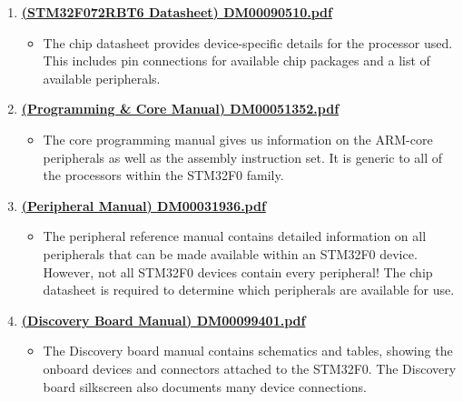 \documentclass[11pt,fleqn]{book} %
\begin{document}
\begin{enumerate}
    \item \href{http://www.st.com/content/ccc/resource/technical/document/datasheet/cd/46/43/83/22/d3/40/c8/DM00090510.pdf/files/DM00090510.pdf/jcr:content/translations/en.DM00090510.pdf}{\textbf{(STM32F072RBT6 Datasheet) DM00090510.pdf}}
    \begin{itemize}
        \item The chip datasheet provides device-specific details for the processor used. This includes pin connections for available chip packages and a list of available peripherals.
    \end{itemize}
    \item
    \href{http://www.st.com/content/ccc/resource/technical/document/programming_manual/fc/90/c7/17/a1/44/43/89/DM00051352.pdf/files/DM00051352.pdf/jcr:content/translations/en.DM00051352.pdf}{\textbf{(Programming \& Core Manual) DM00051352.pdf}}
    \begin{itemize}
        \item The core programming manual gives us information on the ARM-core peripherals as well as the assembly instruction set. It is generic to all of the processors within the STM32F0 family.
    \end{itemize}
    \item
    \href{http://www.st.com/content/ccc/resource/technical/document/reference_manual/c2/f8/8a/f2/18/e6/43/96/DM00031936.pdf/files/DM00031936.pdf/jcr:content/translations/en.DM00031936.pdf}{\textbf{(Peripheral Manual) DM00031936.pdf}}
    \begin{itemize}
        \item The peripheral reference manual contains detailed information on all peripherals that can be made available within an STM32F0 device. However, not all STM32F0 devices contain every peripheral! The chip datasheet is required to determine which peripherals are available for use.
    \end{itemize}
    \item 
    \href{http://www.st.com/content/ccc/resource/technical/document/user_manual/3b/8d/46/57/b7/a9/49/b4/DM00099401.pdf/files/DM00099401.pdf/jcr:content/translations/en.DM00099401.pdf}{\textbf{(Discovery Board Manual) DM00099401.pdf}}
    \begin{itemize}
        \item The Discovery board manual contains schematics and tables, showing the onboard devices and connectors attached to the STM32F0. The Discovery board silkscreen also documents many device connections. 
    \end{itemize}
\end{enumerate}
\end{document}
